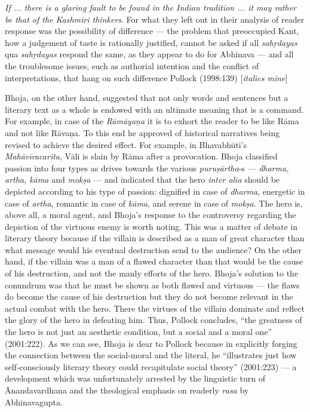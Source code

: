 \smallskip

\begin{myquote}
{\textsl{If ... there is a glaring fault to be found in the Indian tradition ... it may rather be that of the Kashmiri thinkers}}. For what they left out in their analysis of reader response was the possibility of difference --- the problem that preoccupied Kant, how a judgement of taste is rationally justified, cannot be asked if all \textsl{sahṛdayas} qua \textsl{sahṛdayas} respond the same, as they appear to do for Abhinava --- and all the troublesome issues, such as authorial intention and the conflict of interpretations, that hang on such difference 
\hfill Pollock (1998:139) [\textsl{italics mine}]
\end{myquote}

Bhoja, on the other hand, suggested that not only words and sentences but a literary text as a whole is endowed with an ultimate meaning that is a command. For example, in case of the \textsl{Rāmāyaṇa} it is to exhort the reader to be like Rāma and not like Rāvaṇa. To this end he approved of historical narratives being revised to achieve the desired effect. For example, in Bhavabhūti's \textsl{Mahāvīracarita}, Vāli is slain by Rāma after a provocation. Bhoja classified passion into four types as drives towards the various \textsl{puruṣārtha}-s --- \textsl{dharma, artha, kāma} and \textsl{mokṣa} --- and indicated that the hero \textsl{inter alia} should be depicted according to his type of passion: dignified in case of \textsl{dharma}, energetic in case of \textsl{artha}, romantic in case of \textsl{kāma}, and serene in case of \textsl{mokṣa}. The hero is, above all, a moral agent, and Bhoja's response to the controversy regarding the depiction of the virtuous enemy is worth noting. This was a matter of debate in literary theory because if the villain is described as a man of great character than what message would his eventual destruction send to the audience? On the other hand, if the villain was a man of a flawed character than that would be the cause of his destruction, and not the manly efforts of the hero. Bhoja's solution to the conundrum was that he must be shown as both flawed and virtuous --- the flaws do become the cause of his destruction but they do not become relevant in the actual combat with the hero. There the virtues of the villain dominate and reflect the glory of the hero in defeating him. Thus, Pollock concludes, ``the greatness of the hero is not just an aesthetic condition, but a social and a moral one'' (2001:222). As we can see, Bhoja is dear to Pollock because in explicitly forging the connection between the social-moral and the literal, he ``illustrates just how self-consciously literary theory could recapitulate social theory'' (2001:223) --- a development which was unfortunately arrested by the linguistic turn of Ānandavardhana and the theological emphasis on readerly \textsl{rasa} by Abhinavagupta.

